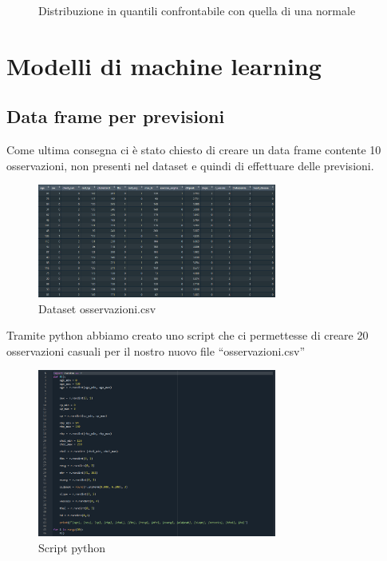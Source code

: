 \documentclass{article}
\begin{document}
\begin{figure}[!htb]
\begin{minipage}{0.475\textwidth}
     \caption{Distribuzione in quantili confrontabile con quella di una normale }
     \label{Fig:ds1}
   \end{minipage}
\end{figure}

\clearpage
\section{ Modelli di machine learning }
\subsection { Data frame per previsioni }
Come ultima consegna ci è stato chiesto di creare un data frame contente 10 osservazioni, non presenti nel dataset e quindi di effettuare delle previsioni.

\begin{figure}[h]
	\centering
	\includegraphics[width=0.7\textwidth]{data frame creato}
	\caption{Dataset osservazioni.csv}
	\label {fig:ds1}
\end{figure}

Tramite python abbiamo creato uno script che ci permettesse di creare 20 osservazioni casuali per il nostro nuovo file “osservazioni.csv”\\
\begin{figure}[h]
	\centering
	\includegraphics[width=0.7\textwidth]{script python}
	\caption{Script python}
	\label {fig:ds1}
\end{figure}
\end{document}
